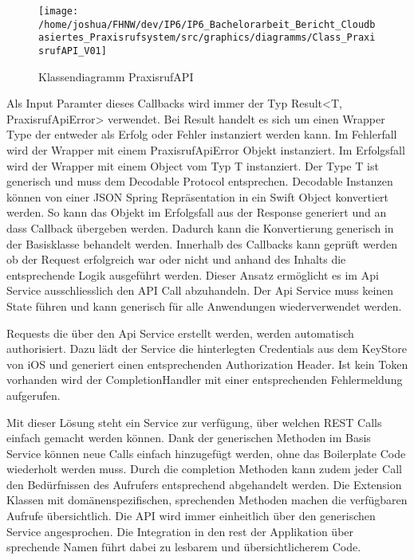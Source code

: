 \begin{figure}[h]
    \centering
    \begin{minipage}[b]{0.8\textwidth}
        \texttt{[image: /home/joshua/FHNW/dev/IP6/IP6\_Bachelorarbeit\_Bericht\_Cloudbasiertes\_Praxisrufsystem/src/graphics/diagramms/Class\_PraxisrufAPI\_V01]}
        \caption{Klassendiagramm PraxisrufAPI}
    \end{minipage}
\end{figure}


%

Als Input Paramter dieses Callbacks wird immer der Typ Result<T, PraxisrufApiError> verwendet.
Bei Result handelt es sich um einen Wrapper Type der entweder als Erfolg oder Fehler instanziert werden kann.
Im Fehlerfall wird der Wrapper mit einem PraxisrufApiError Objekt instanziert.
Im Erfolgsfall wird der Wrapper mit einem Object vom Typ T instanziert.
Der Type T ist generisch und muss dem Decodable Protocol entsprechen.
Decodable Instanzen können von einer JSON Spring Repräsentation in ein Swift Object konvertiert werden.
So kann das Objekt im Erfolgsfall aus der Response generiert und an dass Callback übergeben werden.
Dadurch kann die Konvertierung generisch in der Basisklasse behandelt werden.
Innerhalb des Callbacks kann geprüft werden ob der Request erfolgreich war oder nicht und anhand des Inhalts die entsprechende Logik ausgeführt werden.
Dieser Ansatz ermöglicht es im Api Service ausschliesslich den API Call abzuhandeln.
Der Api Service muss keinen State führen und kann generisch für alle Anwendungen wiederverwendet werden.

Requests die über den Api Service erstellt werden, werden automatisch authorisiert.
Dazu lädt der Service die hinterlegten Credentials aus dem KeyStore von iOS und generiert einen entsprechenden Authorization Header.
Ist kein Token vorhanden wird der CompletionHandler mit einer entsprechenden Fehlermeldung aufgerufen.

Mit dieser Lösung steht ein Service zur verfügung, über welchen REST Calls einfach gemacht werden können.
Dank der generischen Methoden im Basis Service können neue Calls einfach hinzugefügt werden, ohne das Boilerplate Code wiederholt werden muss.
Durch die completion Methoden kann zudem jeder Call den Bedürfnissen des Aufrufers entsprechend abgehandelt werden.
Die Extension Klassen mit domänenspezifischen, sprechenden Methoden machen die verfügbaren Aufrufe übersichtlich.
Die API wird immer einheitlich über den generischen Service angesprochen.
Die Integration in den rest der Applikation über sprechende Namen führt dabei zu lesbarem und übersichtlicherem Code.

